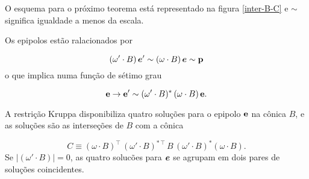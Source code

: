 O esquema para o próximo teorema está representado na figura \ref{inter-B-C} e $\sim$ significa igualdade a menos da escala.

\begin{teorema}
Os epipolos estão ralacionados por 

\begin{equation}\label{eq.equiv-reta-polar-sem-B}
(\omega'\cdot B)\,\boldsymbol{e}'\sim (\omega\cdot B)\,\boldsymbol{e}\sim{\bf p}
\end{equation}
o que implica numa função de sétimo grau 

\begin{equation}\label{eq.map-7-grau}
{\bf e} \rightarrow {\bf e'} \sim (\omega' \cdot B)^*\,(\omega \cdot B)\,{\bf e}.
\end{equation}

A restrição Kruppa disponibiliza quatro soluções para o epipolo ${\bf e}$ na cônica $B$, e as soluções são as interseções  de $B$ com a cônica 

\begin{equation}\label{eq.definicao-conica-C}
C \equiv (\omega \cdot B)^\top\,(\omega' \cdot B)^{*\,\top}\,B\,(\omega' \cdot B)^*(\omega \cdot B).
\end{equation}
Se $|(\omega'\cdot B)|=0$, as quatro solucões para $\boldsymbol{e}$ se agrupam em dois pares de soluções coincidentes.
\end{teorema}

